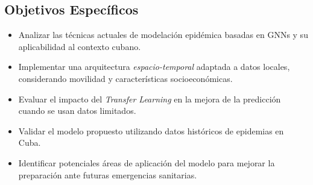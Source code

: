 \subsection*{Objetivos Específicos}
\begin{itemize}
    \item Analizar las técnicas actuales de modelación epidémica basadas en GNNs y su aplicabilidad al contexto cubano.
    \item Implementar una arquitectura \textit{espacio-temporal} adaptada a datos locales, considerando movilidad y características socioeconómicas.
    \item Evaluar el impacto del \textit{Transfer Learning} en la mejora de la predicción cuando se usan datos limitados.
    \item Validar el modelo propuesto utilizando datos históricos de epidemias en Cuba.
    \item Identificar potenciales áreas de aplicación del modelo para mejorar la preparación ante futuras emergencias sanitarias.
\end{itemize}